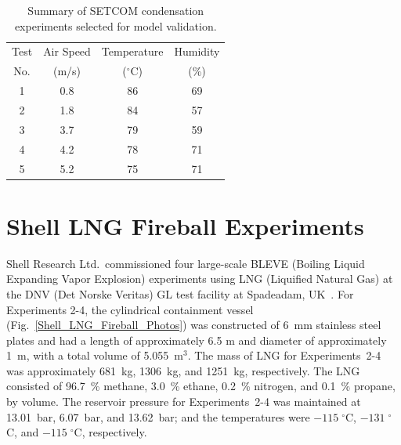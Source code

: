 \begin{table}[h]
   \caption[Summary of SETCOM condensation experiments selected for model validation]{Summary of SETCOM condensation experiments selected for model validation.}
   \begin{center}
      \begin{tabular}{|c|c|c|c|}
         \hline
         Test      &  Air Speed        &  Temperature          &  Humidity             \\
         No.       &  (m/s)            &  ($^{\circ}$C)        &  (\%)                 \\ \hline \hline
         1         &  0.8              &  86                   &  69                   \\ \hline
         2         &  1.8              &  84                   &  57                   \\ \hline
         3         &  3.7              &  79                   &  59                   \\ \hline
         4         &  4.2              &  78                   &  71                   \\ \hline
         5         &  5.2              &  75                   &  71                   \\ \hline
      \end{tabular}
   \end{center}
   \label{SETCOM_condensation_Summary}
\end{table}

\FloatBarrier


\section{Shell LNG Fireball Experiments}
\label{Shell_LNG_Fireballs_Description}

Shell Research Ltd.~commissioned four large-scale BLEVE (Boiling Liquid Expanding Vapor Explosion) experiments using LNG (Liquified Natural Gas) at the DNV (Det Norske Veritas) GL test facility at Spadeadam, UK~\cite{Betteridge:2015}. For Experiments 2-4, the cylindrical containment vessel (Fig.~\ref{Shell_LNG_Fireball_Photos}) was constructed of 6~mm stainless steel plates and had a length of approximately 6.5 m and diameter of approximately 1~m, with a total volume of 5.055~m$^3$. The mass of LNG for Experiments~2-4 was approximately 681~kg, 1306~kg, and 1251~kg, respectively. The LNG consisted of 96.7~\% methane, 3.0~\% ethane, 0.2~\% nitrogen, and 0.1~\% propane, by volume. The reservoir pressure for Experiments~2-4 was maintained at 13.01~bar, 6.07~bar, and 13.62~bar; and the temperatures were $-115 \; ^\circ$C, $-131 \; ^\circ$C, and $-115 \; ^\circ$C, respectively.

